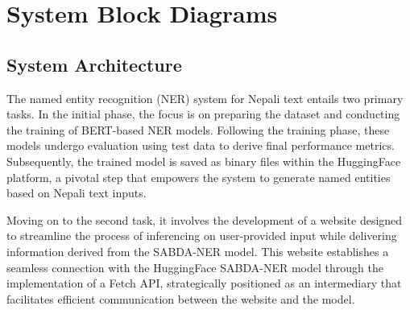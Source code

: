 \newpage
\section{System Block Diagrams}
\vspace{20pt} %

\subsection{System Architecture}
 




The named entity recognition (NER) system for Nepali text entails two primary tasks. In the initial phase, the focus is on preparing the dataset and conducting the training of BERT-based NER models. Following the training phase, these models undergo evaluation using test data to derive final performance metrics. Subsequently, the trained model is saved as binary files within the HuggingFace platform, a pivotal step that empowers the system to generate named entities based on Nepali text inputs.

Moving on to the second task, it involves the development of a website designed to streamline the process of inferencing on user-provided input while delivering information derived from the SABDA-NER model. This website establishes a seamless connection with the HuggingFace SABDA-NER model through the implementation of a Fetch API, strategically positioned as an intermediary that facilitates efficient communication between the website and the model.

